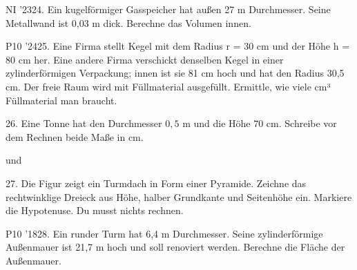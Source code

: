 \documentclass[11pt]{article}
\begin{document}
\pfgruppe{}
\begin{pfaufg}{NI ’23}{24.}{}
Ein kugelförmiger Gasspeicher hat außen 27 m Durchmesser. Seine Metallwand ist 0,03 m dick. Berechne das Volumen innen.
\end{pfaufg}
\pfgruppe{}
\begin{pfaufg}{P10 ’24}{\llap{\textasteriskcentered\,}25.}{}
Eine Firma stellt Kegel mit dem Radius r = 30 cm und der Höhe h = 80 cm her. Eine andere Firma verschickt denselben Kegel in einer zylinderförmigen Verpackung; innen ist sie 81 cm hoch und hat den Radius 30,5 cm. Der freie Raum wird mit Füllmaterial ausgefüllt. Ermittle, wie viele cm³ Füllmaterial man braucht.
\par\smallskip\noindent {}\par
{}
\end{pfaufg}
\pfgruppe{}
\begin{pfaufg}{}{26.}{}
Eine Tonne hat den Durchmesser $0{,}5$ m und die Höhe $70$ cm. Schreibe vor dem Rechnen beide Maße in cm.
\par\noindent \leerfeld[cm]  und \leerfeld[cm] \par
{}
\end{pfaufg}
\begin{pfaufg}{}{27.}{}
Die Figur zeigt ein Turmdach in Form einer Pyramide. Zeichne das rechtwinklige Dreieck aus Höhe, halber Grundkante und Seitenhöhe ein. Markiere die Hypotenuse. Du musst nichts rechnen.
\par\smallskip\noindent {}\par
{}
\end{pfaufg}
\pfgruppe{}
\begin{pfaufg}{P10 ’18}{28.}{}
Ein runder Turm hat 6,4 m Durchmesser. Seine zylinderförmige Außenmauer ist 21,7 m hoch und soll renoviert werden. Berechne die Fläche der Außenmauer.
\end{pfaufg}
\end{document}
